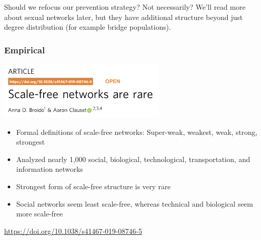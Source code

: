 \documentclass[aspectratio=169]{beamer}
\begin{document}
\begin{frame}
{Should we refocus our prevention strategy?  Not necessarily?  We'll read more about sexual networks later, but they have additional structure beyond just degree distribution (for example bridge populations).
}

\end{frame}
%
%
%
%
\begin{frame}
\frametitle{Empirical}

\begin{center}
\includegraphics[width=0.6\textwidth]{figures/broido_scale-free_2019_title}
\end{center}

\begin{itemize}
\item Formal definitions of scale-free networks: Super-weak, weakest, weak, strong, strongest \pause
\item Analyzed nearly 1,000 social, biological, technological, transportation, and information networks \pause
\item Strongest form of scale-free structure is very rare \pause
\item Social networks seem least scale-free, whereas technical and biological seem more scale-free \pause
\end{itemize}
\vfill
\url{https://doi.org/10.1038/s41467-019-08746-5}

\end{frame}
\end{document}
